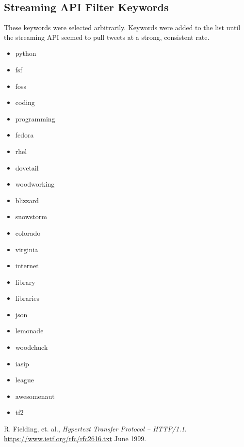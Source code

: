 \documentclass[a4paper,12pt]{article}
\begin{document}
\clearpage
\begin{appendices}

\section{Streaming API Filter Keywords}
These keywords were selected arbitrarily. Keywords were added to the list until the streaming
API seemed to pull tweets at a strong, consistent rate.
\begin{multicols}{3}
\begin{itemize}
    \item python
    \item fsf
    \item foss
    \item coding
    \item programming
    \item fedora
    \item rhel
    \item dovetail
    \item woodworking
    \item blizzard
    \item snowstorm
    \item colorado
    \item virginia
    \item internet
    \item library
    \item libraries
    \item json
    \item lemonade
    \item woodchuck
    \item iasip
    \item league
    \item awesomenaut
    \item tf2
\end{itemize}
\end{multicols}

\end{appendices}




\begin{thebibliography}{9}
    R. Fielding, et. al.,
    \emph{Hypertext Transfer Protocol -- HTTP/1.1}.
    \url{https://www.ietf.org/rfc/rfc2616.txt}
    June 1999.


\end{thebibliography}
\end{document}
